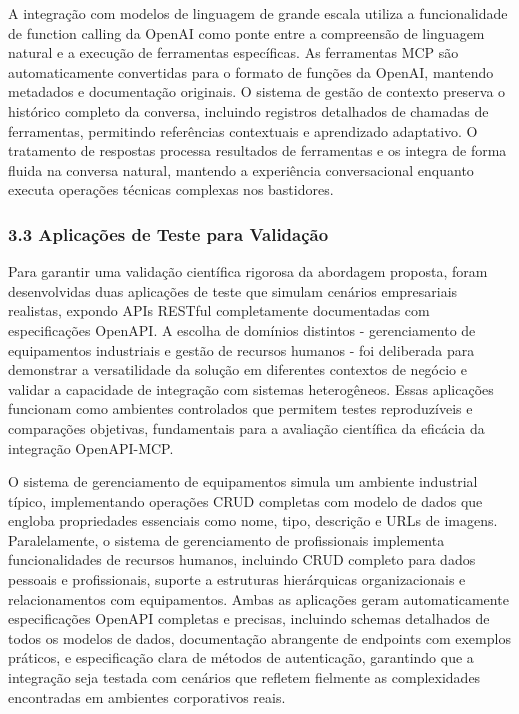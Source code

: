 \documentclass[
]{article}
\begin{document}
A integração com modelos de linguagem de grande escala utiliza a
funcionalidade de function calling da OpenAI como ponte entre a
compreensão de linguagem natural e a execução de ferramentas
específicas. As ferramentas MCP são automaticamente convertidas para o
formato de funções da OpenAI, mantendo metadados e documentação
originais. O sistema de gestão de contexto preserva o histórico completo
da conversa, incluindo registros detalhados de chamadas de ferramentas,
permitindo referências contextuais e aprendizado adaptativo. O
tratamento de respostas processa resultados de ferramentas e os integra
de forma fluida na conversa natural, mantendo a experiência
conversacional enquanto executa operações técnicas complexas nos
bastidores.

\subsubsection{3.3 Aplicações de Teste para
Validação}\label{aplicauxe7uxf5es-de-teste-para-validauxe7uxe3o}

Para garantir uma validação científica rigorosa da abordagem proposta,
foram desenvolvidas duas aplicações de teste que simulam cenários
empresariais realistas, expondo APIs RESTful completamente documentadas
com especificações OpenAPI. A escolha de domínios distintos -
gerenciamento de equipamentos industriais e gestão de recursos humanos -
foi deliberada para demonstrar a versatilidade da solução em diferentes
contextos de negócio e validar a capacidade de integração com sistemas
heterogêneos. Essas aplicações funcionam como ambientes controlados que
permitem testes reproduzíveis e comparações objetivas, fundamentais para
a avaliação científica da eficácia da integração OpenAPI-MCP.

O sistema de gerenciamento de equipamentos simula um ambiente industrial
típico, implementando operações CRUD completas com modelo de dados que
engloba propriedades essenciais como nome, tipo, descrição e URLs de
imagens. Paralelamente, o sistema de gerenciamento de profissionais
implementa funcionalidades de recursos humanos, incluindo CRUD completo
para dados pessoais e profissionais, suporte a estruturas hierárquicas
organizacionais e relacionamentos com equipamentos. Ambas as aplicações
geram automaticamente especificações OpenAPI completas e precisas,
incluindo schemas detalhados de todos os modelos de dados, documentação
abrangente de endpoints com exemplos práticos, e especificação clara de
métodos de autenticação, garantindo que a integração seja testada com
cenários que refletem fielmente as complexidades encontradas em
ambientes corporativos reais.
\end{document}
